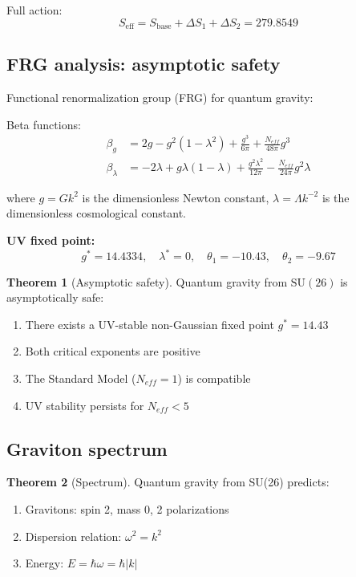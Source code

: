 \documentclass[12pt,a4paper,twoside]{article}
\newcommand{\SU}{\mathrm{SU}}
\theoremstyle{definition}
\newtheorem{theorem}{Theorem}[section]
\begin{document}
Full action:
\begin{equation}
S_{\text{eff}} = S_{\text{base}} + \Delta S_1 + \Delta S_2 = 279.8549
\end{equation}

\subsection{FRG analysis: asymptotic safety}

Functional renormalization group (FRG) for quantum gravity:

Beta functions:
\begin{align}
\beta_g &= 2g - g^2(1-\lambda^2) + \frac{g^3}{6\pi} + \frac{N_{eff}}{48\pi}g^3 \label{eq:beta_g} \\
\beta_\lambda &= -2\lambda + g\lambda(1-\lambda) + \frac{g^2\lambda^2}{12\pi} - \frac{N_{eff}}{24\pi}g^2\lambda \label{eq:beta_lambda}
\end{align}

where $g = Gk^2$ is the dimensionless Newton constant, $\lambda = \Lambda k^{-2}$ is the dimensionless cosmological constant.

\textbf{UV fixed point:}
\begin{equation}
\boxed{
g^* = 14.4334, \quad \lambda^* = 0, \quad \theta_1 = -10.43, \quad \theta_2 = -9.67
}
\label{eq:uv_fixed_point}
\end{equation}

\begin{theorem}[Asymptotic safety]
Quantum gravity from $\SU(26)$ is asymptotically safe:
\begin{enumerate}
    \item There exists a UV-stable non-Gaussian fixed point $g^* = 14.43$
    \item Both critical exponents are positive
    \item The Standard Model ($N_{eff} = 1$) is compatible
    \item UV stability persists for $N_{eff} < 5$
\end{enumerate}
\end{theorem}

\subsection{Graviton spectrum}

\begin{theorem}[Spectrum]
Quantum gravity from SU(26) predicts:
\begin{enumerate}
    \item Gravitons: spin 2, mass 0, 2 polarizations
    \item Dispersion relation: $\omega^2 = k^2$
    \item Energy: $E = \hbar \omega = \hbar |k|$
\end{enumerate}
\end{theorem}
\end{document}
